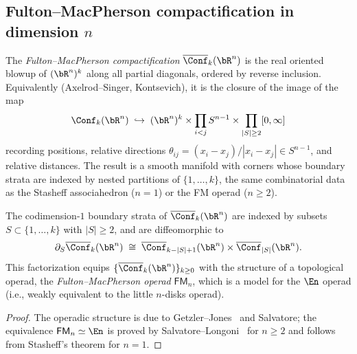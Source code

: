 \subsection{\texorpdfstring{Fulton--MacPherson compactification in dimension $n$}{Fulton--MacPherson compactification in dimension n}}
\label{subsec:fm-general-n}

\begin{definition}
\label{def:fm-rn}
The \emph{Fulton--MacPherson compactification}
$\overline{\Conf}_k(\bR^n)$ is the real oriented blowup of $(\bR^n)^k$
along all partial diagonals, ordered by reverse inclusion.
Equivalently (Axelrod--Singer, Kontsevich), it is the closure of
the image of the map
\[
\Conf_k(\bR^n)
\;\hookrightarrow\;
(\bR^n)^k
\times \prod_{i<j} S^{n-1}
\times \prod_{|S| \geq 2} [0, \infty]
\]
recording positions, relative directions
$\theta_{ij} = (x_i - x_j)/|x_i - x_j| \in S^{n-1}$,
and relative distances. The result is a smooth manifold with
corners whose boundary strata are indexed by nested partitions
of $\{1, \ldots, k\}$, the same combinatorial data as the
Stasheff associahedron ($n = 1$) or the FM operad ($n \geq 2$).
\end{definition}

\begin{proposition}
\label{prop:fm-boundary-strata}
The codimension-$1$ boundary strata of
$\overline{\Conf}_k(\bR^n)$ are indexed by subsets
$S \subset \{1, \ldots, k\}$ with $|S| \geq 2$, and are
diffeomorphic to
\[
\partial_S \overline{\Conf}_k(\bR^n)
\;\cong\;
\overline{\Conf}_{k-|S|+1}(\bR^n)
\times
\overline{\Conf}_{|S|}(\bR^n).
\]
This factorization equips $\{\overline{\Conf}_k(\bR^n)\}_{k \geq 0}$
with the structure of a topological operad, the
\emph{Fulton--MacPherson operad} $\mathsf{FM}_n$, which is a model
for the $\En$ operad \textup{(}i.e., weakly equivalent to the
little $n$-disks operad\textup{)}.
\end{proposition}

\begin{proof}
The operadic structure is due to Getzler--Jones~\cite{GJ}
and Salvatore; the equivalence $\mathsf{FM}_n \simeq \En$ is
proved by Salvatore--Longoni~\cite{SalvatoreLongoni05} for $n \geq 2$ and follows from
Stasheff's theorem for $n = 1$.
\end{proof}


